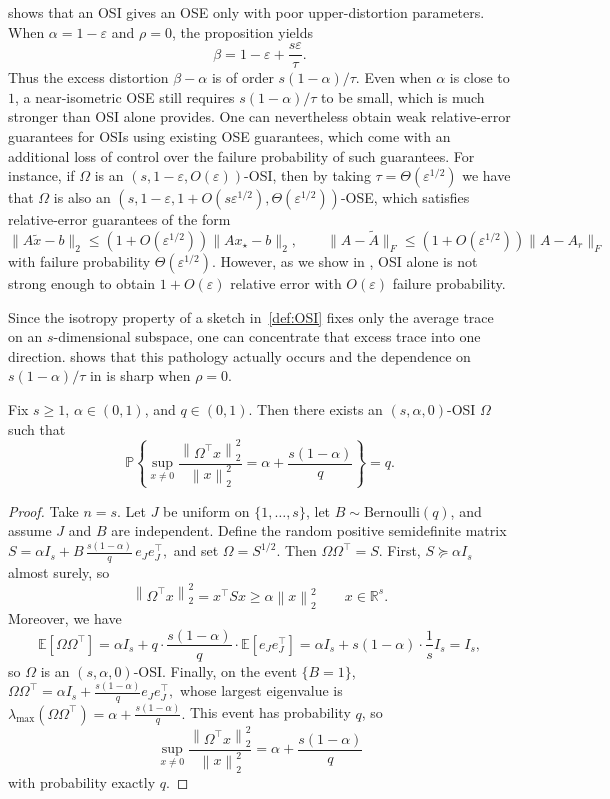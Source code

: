 \documentclass[onefignum,onetabnum]{siamart251216}
\newcommand{\R}{\mathbb{R}}
\newcommand{\norm}[1]{\left\lVert #1 \right\rVert}
\newcommand{\eps}{\varepsilon}
\begin{document}
 shows that an OSI gives an OSE only with poor upper-distortion parameters. When $\alpha=1-\eps$ and $\rho=0$, the proposition yields
\[
\beta = 1-\eps+\frac{s\eps}{\tau}.
\]
Thus the excess distortion $\beta-\alpha$ is of order $s(1-\alpha)/\tau$. Even when $\alpha$ is close to $1$, a near-isometric OSE still requires $s(1-\alpha)/\tau$ to be small, which is much stronger than OSI alone provides. One can nevertheless obtain weak relative-error guarantees for OSIs using existing OSE guarantees, which come with an additional loss of control over the failure probability of such guarantees. For instance, if $\Omega$ is an $(s,1-\eps,O(\eps))$-OSI, then by taking $\tau=\Theta(\eps^{1/2})$ we have that $\Omega$ is also an $(s,1-\eps,1+O(s\eps^{1/2}),\Theta(\eps^{1/2}))$-OSE, which satisfies relative-error guarantees of the form
\[
\|A\widetilde{x}-b\|_2 \le (1+O(\eps^{1/2}))\|Ax_\star-b\|_2, \qquad \|A-\widetilde{A}\|_F \le (1+O(\eps^{1/2}))\|A-A_r\|_F
\]
with failure probability $\Theta(\eps^{1/2})$.  However, as we show in , OSI alone is not strong enough to obtain $1+O(\eps)$ relative error with $O(\eps)$ failure probability.

Since the isotropy property of a sketch in~\cref{def:OSI} fixes only the average trace on an $s$-dimensional subspace,  one can concentrate that excess trace into one direction.   shows that this pathology actually occurs and the dependence on $s(1-\alpha)/\tau$ in  is sharp when $\rho=0$.
 
\begin{proposition}\label{prop:osi-markov-sharp}
Fix $s\ge 1$, $\alpha\in(0,1)$, and $q\in(0,1)$.
Then there exists an $(s,\alpha,0)$-OSI $\Omega$ such that
\[
\mathbb P\!\left\{
\sup_{x\neq 0}
\frac{\norm{\Omega^\top x}_2^2}{\norm{x}_2^2}
=
\alpha+\frac{s(1-\alpha)}{q}
\right\}
= q.
\]
\end{proposition}

\begin{proof}
Take $n=s$. Let $J$ be uniform on $\{1,\dots,s\}$, let
$B\sim\mathrm{Bernoulli}(q)$, and assume $J$ and $B$ are independent.
Define the random positive semidefinite matrix
$
S
=
\alpha I_s
+
B\,\frac{s(1-\alpha)}{q}\, e_J e_J^\top,
$
and set
$
\Omega = S^{1/2}.
$
Then $\Omega\Omega^\top = S$.  First, $S\succeq \alpha I_s$ almost surely, so
\[
\norm{\Omega^\top x}_2^2 = x^\top S x \ge \alpha \norm{x}_2^2
\qquad x\in\R^s.
\]
Moreover,  we have
\[
\mathbb E[\Omega\Omega^\top]
=
\alpha I_s
+
q\cdot \frac{s(1-\alpha)}{q}\cdot
\mathbb E[e_J e_J^\top]
=
\alpha I_s
+
s(1-\alpha)\cdot \frac1s I_s
=
I_s,
\]
so $\Omega$ is an $(s,\alpha,0)$-OSI.  Finally, on the event $\{B=1\}$,
$
\Omega\Omega^\top =\alpha I_s+\frac{s(1-\alpha)}{q} e_J e_J^\top,
$
whose largest eigenvalue is
$
\lambda_{\max}(\Omega\Omega^\top)=\alpha+\frac{s(1-\alpha)}{q}.
$
This event has probability $q$, so
\[
\sup_{x\ne 0}\frac{\norm{\Omega^\top x}_2^2}{\norm{x}_2^2}
=
\alpha+\frac{s(1-\alpha)}{q}
\]
with probability exactly $q$.  
\end{proof}
\end{document}
